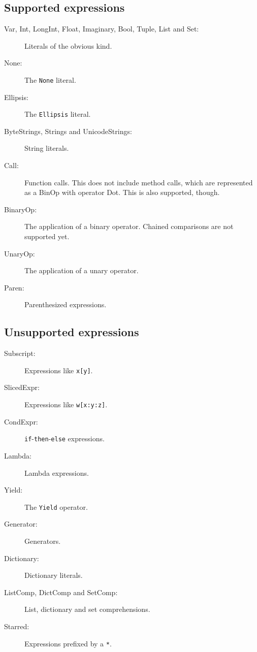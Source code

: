 \documentclass[11pt]{report}
\begin{document}
\subsection{Supported expressions}
\begin{description}
  \item[Var, Int, LongInt, Float, Imaginary, Bool, Tuple, List and
    Set:] Literals of the obvious kind.
  \item[None:] The \verb|None| literal.
  \item[Ellipsis:] The \verb|Ellipsis| literal.
  \item[ByteStrings, Strings and UnicodeStrings:] String literals.
  \item[Call:] Function calls. This does not include method calls,
    which are represented as a BinOp with operator Dot. This is also
    supported, though.
  \item[BinaryOp:] The application of a binary operator. Chained
    comparisons are not supported yet.
  \item[UnaryOp:] The application of a unary operator.
  \item[Paren:] Parenthesized expressions.
\end{description}

\subsection{Unsupported expressions}
\begin{description}
  \item[Subscript:] Expressions like \verb|x[y]|.
  \item[SlicedExpr:] Expressions like \verb|w[x:y:z]|.
  \item[CondExpr:] \verb|if|-\verb|then|-\verb|else| expressions.
  \item[Lambda:] Lambda expressions.
  \item[Yield:] The \verb|Yield| operator.
  \item[Generator:] Generators.
  \item[Dictionary:] Dictionary literals.
  \item[ListComp, DictComp and SetComp:] List, dictionary and set
    comprehensions.
  \item[Starred:] Expressions prefixed by a \verb|*|.
\end{description}
\end{document}
